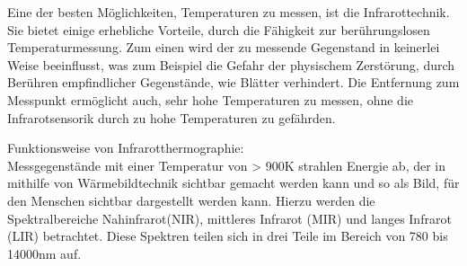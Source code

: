 Eine der besten Möglichkeiten, Temperaturen zu messen, ist die Infrarottechnik.
Sie bietet einige erhebliche Vorteile, durch die Fähigkeit zur berührungslosen
Temperaturmessung. Zum einen wird der zu messende Gegenstand in keinerlei Weise
beeinflusst, was zum Beispiel die Gefahr der physischem Zerstörung, durch
Berühren empfindlicher Gegenstände, wie Blätter verhindert. Die
Entfernung zum Messpunkt ermöglicht auch, sehr hohe Temperaturen zu messen,
ohne die Infrarotsensorik durch zu hohe Temperaturen zu gefährden.

Funktionsweise von Infrarotthermographie: \\
Messgegenstände mit einer Temperatur von > 900K strahlen Energie ab, der in mithilfe von Wärmebildtechnik sichtbar gemacht werden kann und so als Bild, für den Menschen sichtbar dargestellt werden kann.
Hierzu werden die Spektralbereiche Nahinfrarot(NIR), mittleres Infrarot (MIR) und langes Infrarot (LIR) betrachtet. 
Diese Spektren teilen sich in drei Teile im Bereich von 780 bis 14000nm auf. \cite{schuster2004infrarotthermographie}
